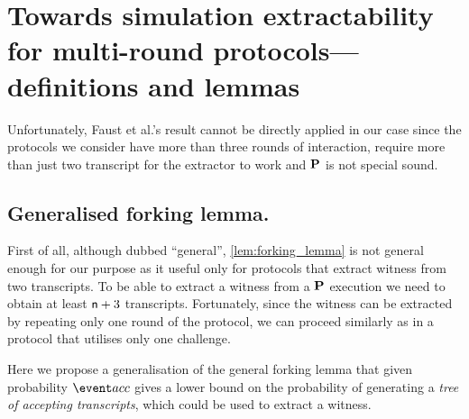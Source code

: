 \documentclass[runningheads,11pt]{llncs}
\theoremstyle{definition}
\begin{document}
\section{Towards simulation extractability for multi-round protocols---definitions and lemmas}
Unfortunately, Faust et al.'s result cannot be directly applied in our case since the protocols we consider have more than three rounds of interaction, require more than just two transcript for the extractor to work and $\mathbf{P}$ is not special sound.

\subsection{Generalised forking lemma.}
First of all, although dubbed ``general'', \cref{lem:forking_lemma} is not general enough for our purpose as it useful only for protocols that extract witness from two transcripts. 
To be able to extract a witness from a $\mathbf{P}$ execution we need to obtain at least $\mathsf{n} + 3$ transcripts.
Fortunately, since the witness can be extracted by repeating only one round of the protocol, we can proceed similarly as in a protocol that utilises only one challenge.

Here we propose a generalisation of the general forking lemma that given probability $\accProb$ gives a lower bound on the probability of generating a \emph{tree of accepting transcripts}, which could be used to extract a witness. 
\end{document}
